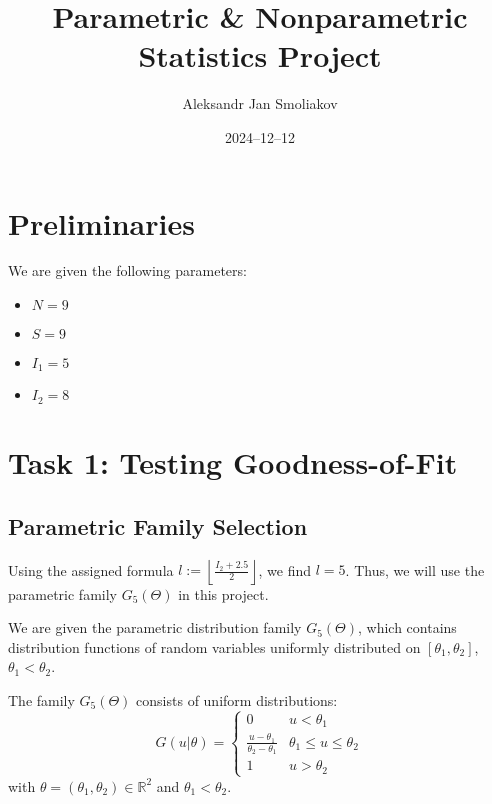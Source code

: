 \documentclass{article}
\title{Parametric \& Nonparametric Statistics Project}
\author{Aleksandr Jan Smoliakov}
\date{2024--12--12}
\begin{document}
\maketitle

\section{Preliminaries}

We are given the following parameters:
\begin{itemize}
    \item $N = 9$
    \item $S = 9$
    \item $I_1 = 5$
    \item $I_2 = 8$
\end{itemize}


\section{Task 1: Testing Goodness-of-Fit}

\subsection{Parametric Family Selection}

Using the assigned formula $l := \left\lfloor \frac{I_2 + 2.5}{2} \right\rfloor$, we find $l = 5$. Thus, we will use the parametric family $G_5(\Theta)$ in this project.

We are given the parametric distribution family $G_5(\Theta)$, which contains distribution functions of random variables uniformly distributed on $[\theta_1, \theta_2]$, $\theta_1 < \theta_2$.

The family \( G_5(\Theta) \) consists of uniform distributions:
\[
G(u|\theta) = \begin{cases}
0 & u < \theta_1 \\
\frac{u - \theta_1}{\theta_2 - \theta_1} & \theta_1 \le u \le \theta_2 \\
1 & u > \theta_2
\end{cases}
\]
with \(\theta = (\theta_1, \theta_2) \in \mathbb{R}^2\) and \(\theta_1 < \theta_2.\)
\end{document}

